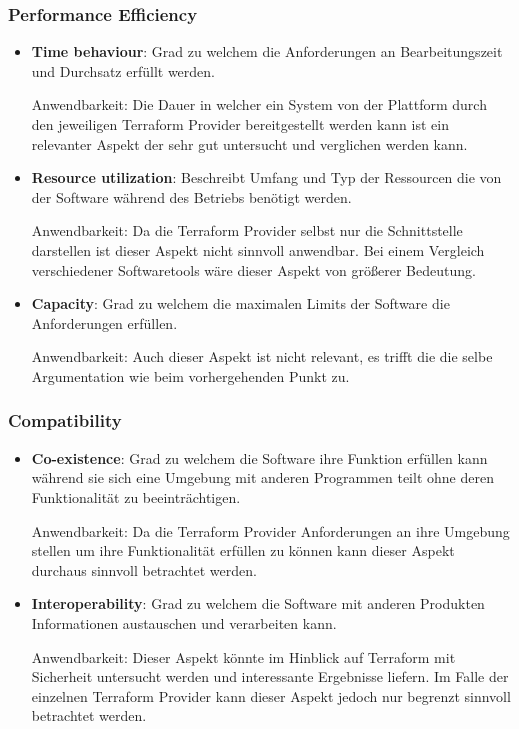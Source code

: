 \subsubsection{Performance Efficiency}

\begin{itemize}
  \item \textbf{Time behaviour}: Grad zu welchem die Anforderungen an
  Bearbeitungszeit und Durchsatz erfüllt werden.

  Anwendbarkeit: Die Dauer in welcher ein System von der Plattform durch
  den jeweiligen Terraform Provider bereitgestellt werden kann ist ein
  relevanter Aspekt der sehr gut untersucht und verglichen werden kann.

  \item \textbf{Resource utilization}: Beschreibt Umfang und Typ der
  Ressourcen die von der Software während des Betriebs benötigt werden.

  Anwendbarkeit: Da die Terraform Provider selbst nur die
  Schnittstelle darstellen ist dieser Aspekt nicht sinnvoll anwendbar.
  Bei einem
  Vergleich verschiedener Softwaretools wäre dieser Aspekt von größerer
  Bedeutung.

  \item \textbf{Capacity}: Grad zu welchem die maximalen Limits der
  Software die Anforderungen erfüllen.

  Anwendbarkeit: Auch dieser Aspekt ist nicht relevant, es trifft die
  die selbe Argumentation wie beim vorhergehenden Punkt zu.
\end{itemize}

\subsubsection{Compatibility}

\begin{itemize}
  \item \textbf{Co-existence}: Grad zu welchem die Software ihre Funktion
  erfüllen kann während sie sich eine Umgebung mit anderen Programmen
  teilt ohne deren Funktionalität zu beeinträchtigen.

  Anwendbarkeit: Da die Terraform Provider Anforderungen an ihre Umgebung
  stellen um ihre Funktionalität erfüllen zu können kann dieser Aspekt
  durchaus sinnvoll betrachtet werden.

  \item \textbf{Interoperability}: Grad zu welchem die Software mit
  anderen Produkten Informationen austauschen und verarbeiten kann.

  Anwendbarkeit: Dieser Aspekt könnte im Hinblick auf Terraform mit
  Sicherheit untersucht werden und interessante Ergebnisse liefern.
  Im Falle der einzelnen Terraform Provider kann dieser Aspekt jedoch
  nur begrenzt sinnvoll betrachtet werden.
\end{itemize}

